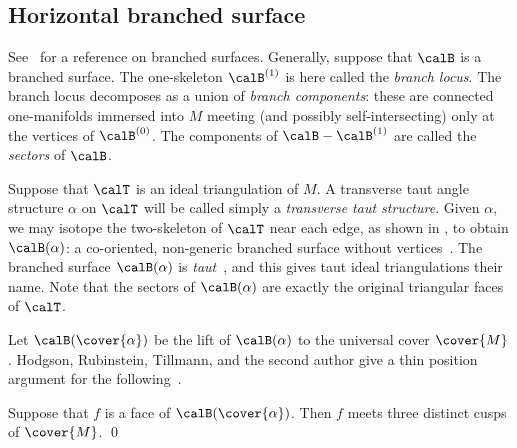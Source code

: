 \documentclass[12pt]{amsart}
\begin{document}
\begin{figure}[htbp]
\centering
{}
\qquad \qquad
{}
\caption{}
\label{Fig:Transverse}
\end{figure}

\subsection{Horizontal branched surface}

See~\cite[Section~6.3]{Calegari07} for a reference on branched surfaces.  Generally, suppose that $\calB$ is a branched surface.  The one-skeleton $\calB^{(1)}$ is here called the \emph{branch locus}.  
The branch locus decomposes as a union of \emph{branch components}: these are connected one-manifolds immersed into $M$ meeting (and possibly self-intersecting) only at the vertices of $\calB^{(0)}$.  The components of $\calB - \calB^{(1)}$ are called the \emph{sectors} of $\calB$.  

Suppose that $\calT$ is an ideal triangulation of $M$.  A transverse taut angle structure $\alpha$ on $\calT$ will be called simply a \emph{transverse taut structure}.  Given $\alpha$, we may isotope the two-skeleton of $\calT$ near each edge, as shown in , to obtain $\calB(\alpha)$: a co-oriented, non-generic branched surface without vertices~\cite[page~371]{Lackenby00}.  The branched surface $\calB(\alpha)$ is \emph{taut}~\cite[page~374]{Lackenby00}, and this gives taut ideal triangulations their name.  Note that the sectors of $\calB(\alpha)$ are exactly the original triangular faces of $\calT$. 

Let $\calB(\cover{\alpha})$ be the lift of $\calB(\alpha)$ to the universal cover $\cover{M}$.  Hodgson, Rubinstein, Tillmann, and the second author give a thin position argument for the following~\cite[Theorem~6.1]{Hodgson15}.

\begin{theorem}
\label{Thm:ThreeDistinct}
Suppose that $f$ is a face of $\calB(\cover{\alpha})$.  Then $f$ meets three distinct cusps of $\cover{M}$.  \qed
\end{theorem}
\end{document}
